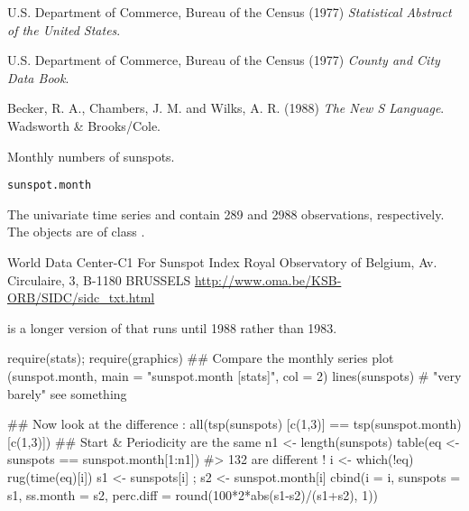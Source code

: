%
\begin{Source}\relax
U.S. Department of Commerce, Bureau of the Census (1977)
\emph{Statistical Abstract of the United States}.

U.S. Department of Commerce, Bureau of the Census (1977)
\emph{County and City Data Book}.
\end{Source}
%
\begin{References}\relax
Becker, R. A., Chambers, J. M. and Wilks, A. R. (1988)
\emph{The New S Language}.
Wadsworth \& Brooks/Cole.
\end{References}
%
\begin{Description}\relax
Monthly numbers of sunspots. 
\end{Description}
%
\begin{Usage}
\begin{verbatim}
sunspot.month
\end{verbatim}
\end{Usage}
%
\begin{Format}
The univariate time series  and
 contain 289 and 2988 observations, respectively.
The objects are of class .
\end{Format}
%
\begin{Source}\relax
World Data Center-C1 For Sunspot Index
Royal Observatory of Belgium, Av. Circulaire, 3, B-1180 BRUSSELS
\url{http://www.oma.be/KSB-ORB/SIDC/sidc_txt.html}
\end{Source}
%
\begin{SeeAlso}\relax
{} is a longer version of 
that runs until 1988 rather than 1983.
\end{SeeAlso}
%
\begin{Examples}
\begin{ExampleCode}
require(stats); require(graphics)
## Compare the monthly series 
plot (sunspot.month, main = "sunspot.month [stats]", col = 2)
lines(sunspots) # "very barely" see something

## Now look at the difference :
all(tsp(sunspots)     [c(1,3)] ==
    tsp(sunspot.month)[c(1,3)]) ## Start & Periodicity are the same
n1 <- length(sunspots)
table(eq <- sunspots == sunspot.month[1:n1]) #>  132  are different !
i <- which(!eq) 
rug(time(eq)[i])
s1 <- sunspots[i] ; s2 <- sunspot.month[i]
cbind(i = i, sunspots = s1, ss.month = s2,
      perc.diff = round(100*2*abs(s1-s2)/(s1+s2), 1))
\end{ExampleCode}
\end{Examples}
